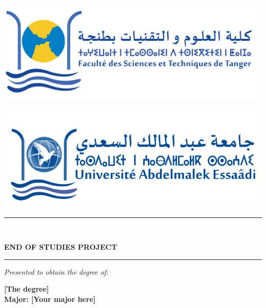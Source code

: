 
\begin{center}
    
    \begin{minipage}[t]{0.45\textwidth}
        \centering
        \includegraphics[height=0.32\linewidth]{assets/fstt.png} %
    \end{minipage}%
    \hfill
    \begin{minipage}[t]{0.45\textwidth}
        \centering
        \includegraphics[height=0.32\linewidth]{assets/uae.png} %
    \end{minipage}

    \vspace{0.1cm}

    \begin{center}
        \rule{0.5\textwidth}{1pt}\\[0.2cm]
        {\fontsize{16}{18}\selectfont\bfseries END OF STUDIES PROJECT\par}
        \rule{0.5\textwidth}{1pt}
    \end{center}

    \vspace{0.1cm}
    
    {\large\itshape{Presented to obtain the degree of:}\/\par}
    \vspace{0.1cm}
    {\Large\bfseries [The degree]\\
    \vspace{0.1cm}
    Major: [Your major here]\par}


\end{center}
